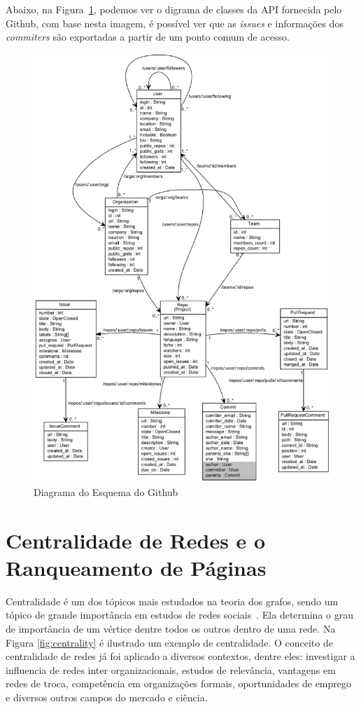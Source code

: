 Abaixo, na Figura~\ref{fig:github_api}, podemos ver o digrama de classes da API fornecida pelo Github, com base nesta imagem, é possível ver que as \textit{issues} e informações dos \textit{commiters} são exportadas a partir de um ponto comum de acesso.
\newpage
\begin{figure}[!h]
    \centering
        \includegraphics[width=\textwidth,height=\textheight,keepaspectratio=true]{figuras/gtschema.eps}
    \caption{Diagrama do Esquema do Github}
    \label{fig:github_api}
\end{figure}

\section{Centralidade de Redes e o Ranqueamento de Páginas}
\label{ref:cen}
Centralidade é um dos tópicos mais estudados na teoria dos grafos, sendo um tópico de grande importância em estudos de redes sociais~\cite{networks}. Ela determina o grau de importância de um vértice dentre todos os outros dentro de uma rede. Na Figura \ref{fig:centrality} é ilustrado um exemplo de centralidade. O conceito de centralidade de redes já foi aplicado a diversos contextos, dentre eles: investigar a influencia de redes inter organizacionais, estudos de relevância, vantagens em redes de troca, competência em organizações formais, oportunidades de emprego e diversos outros campos do mercado e ciência\cite{centrality}.

